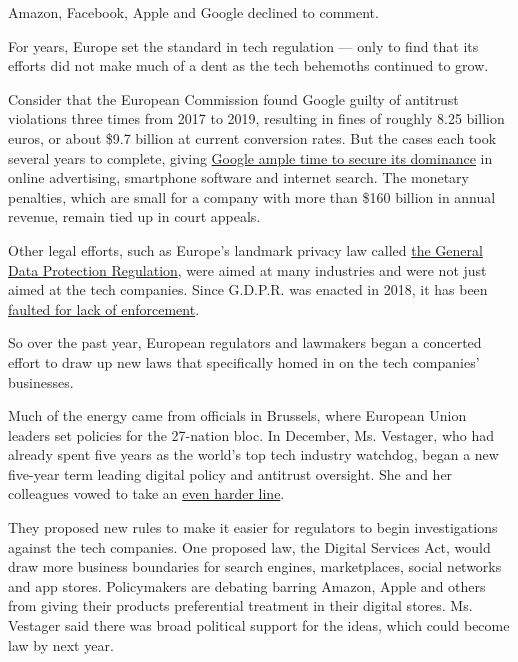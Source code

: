 Amazon, Facebook, Apple and Google declined to comment.

For years, Europe set the standard in tech regulation --- only to find
that its efforts did not make much of a dent as the tech behemoths
continued to grow.

Consider that the European Commission found Google guilty of antitrust
violations three times from 2017 to 2019, resulting in fines of roughly
8.25 billion euros, or about \$9.7 billion at current conversion rates.
But the cases each took several years to complete, giving
\href{https://www.nytimes.com/2019/11/11/business/europe-technology-antitrust-regulation.html}{Google
ample time to secure its dominance} in online advertising, smartphone
software and internet search. The monetary penalties, which are small
for a company with more than \$160 billion in annual revenue, remain
tied up in court appeals.

Other legal efforts, such as Europe's landmark privacy law called
\href{https://www.nytimes.com/2018/05/24/technology/europe-gdpr-privacy.html}{the
General Data Protection Regulation}, were aimed at many industries and
were not just aimed at the tech companies. Since G.D.P.R. was enacted in
2018, it has been
\href{https://www.nytimes.com/2020/04/27/technology/GDPR-privacy-law-europe.html}{faulted
for lack of enforcement}.

So over the past year, European regulators and lawmakers began a
concerted effort to draw up new laws that specifically homed in on the
tech companies' businesses.

Much of the energy came from officials in Brussels, where European Union
leaders set policies for the 27-nation bloc. In December, Ms. Vestager,
who had already spent five years as the world's top tech industry
watchdog, began a new five-year term leading digital policy and
antitrust oversight. She and her colleagues vowed to take an
\href{https://www.google.com/search?q=nytimes+vestager+satariano\&oq=nytimes+vestager+satariano\&aqs=chrome..69i57j69i64j69i61.5096j0j7\&sourceid=chrome\&ie=UTF-8}{even
harder line}.

They proposed new rules to make it easier for regulators to begin
investigations against the tech companies. One proposed law, the Digital
Services Act, would draw more business boundaries for search engines,
marketplaces, social networks and app stores. Policymakers are debating
barring Amazon, Apple and others from giving their products preferential
treatment in their digital stores. Ms. Vestager said there was broad
political support for the ideas, which could become law by next year.

